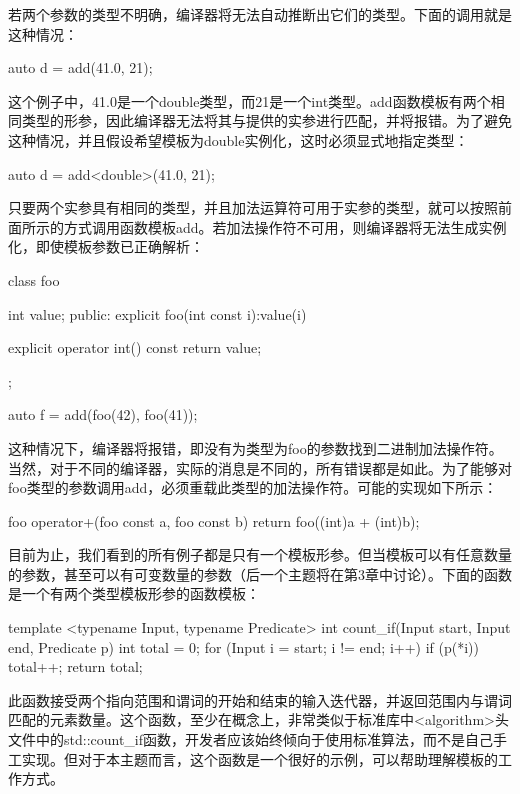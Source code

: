 若两个参数的类型不明确，编译器将无法自动推断出它们的类型。下面的调用就是这种情况：

\begin{cppcode}
auto d = add(41.0, 21);
\end{cppcode}

这个例子中，41.0是一个double类型，而21是一个int类型。add函数模板有两个相同类型的形参，因此编译器无法将其与提供的实参进行匹配，并将报错。为了避免这种情况，并且假设希望模板为double实例化，这时必须显式地指定类型：

\begin{cppcode}
auto d = add<double>(41.0, 21);
\end{cppcode}

只要两个实参具有相同的类型，并且加法运算符可用于实参的类型，就可以按照前面所示的方式调用函数模板add。若加法操作符不可用，则编译器将无法生成实例化，即使模板参数已正确解析：

\begin{cppcode}
class foo
{
	int value;
public:
	explicit foo(int const i):value(i)
	{ }
	
	explicit operator int() const { return value; }
};

auto f = add(foo(42), foo(41));
\end{cppcode}

这种情况下，编译器将报错，即没有为类型为foo的参数找到二进制加法操作符。当然，对于不同的编译器，实际的消息是不同的，所有错误都是如此。为了能够对foo类型的参数调用add，必须重载此类型的加法操作符。可能的实现如下所示：

\begin{cppcode}
foo operator+(foo const a, foo const b)
{
	return foo((int)a + (int)b);
}
\end{cppcode}

目前为止，我们看到的所有例子都是只有一个模板形参。但当模板可以有任意数量的参数，甚至可以有可变数量的参数（后一个主题将在第3章中讨论）。下面的函数是一个有两个类型模板形参的函数模板：

\begin{cppcode}
template <typename Input, typename Predicate>
int count_if(Input start, Input end, Predicate p)
{
	int total = 0;
	for (Input i = start; i != end; i++)
	{
		if (p(*i))
			total++;
	}
	return total;
}
\end{cppcode}

此函数接受两个指向范围和谓词的开始和结束的输入迭代器，并返回范围内与谓词匹配的元素数量。这个函数，至少在概念上，非常类似于标准库中<algorithm>头文件中的std::count_if函数，开发者应该始终倾向于使用标准算法，而不是自己手工实现。但对于本主题而言，这个函数是一个很好的示例，可以帮助理解模板的工作方式。

